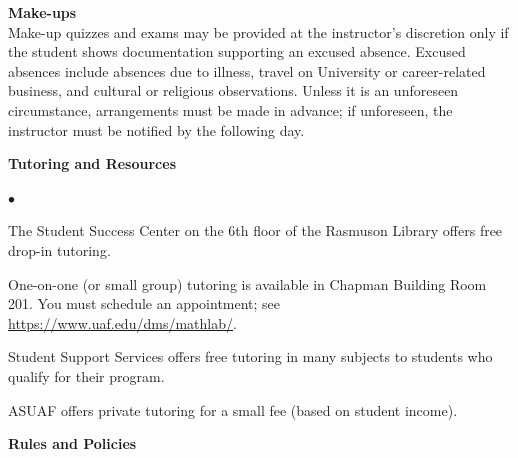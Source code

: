 \documentclass[12pt]{article}
\renewcommand{\emph}[1]{\textsf{\textbf{#1}}}
\newcommand{\localhead}[1]{\par\smallskip\textbf{#1}\nobreak\\}%
\def\heading#1{\localhead{\large\emph{#1}}}
\def\subheading#1{\localhead{\emph{#1}}}
\newenvironment{clist}%
{\bgroup\parskip 0pt\begin{list}{$\bullet$}{\partopsep 4pt\topsep 0pt\itemsep -2pt}}%
{\end{list}\egroup}%
\begin{document}
\heading{Make-ups}
Make-up quizzes and exams may be provided at the instructor's discretion only if
the student shows documentation supporting an excused absence. Excused
absences include absences due to illness, travel on University or
career-related business, and cultural or religious
observations. Unless it is an unforeseen circumstance, arrangements
must be made in advance; if unforeseen, the instructor must be notified
by the following day.

\heading{Tutoring and Resources}
\vskip -30pt\strut
\begin{clist}
	\item The Student Success Center on the 6th floor of the Rasmuson Library offers free drop-in tutoring.
	\item One-on-one (or small group) tutoring is available in 
Chapman Building Room 201. You must schedule an
appointment; see \url{https://www.uaf.edu/dms/mathlab/}.
	\item Student Support Services offers free tutoring in many subjects to students who qualify for their program.
	\item ASUAF offers private tutoring for a small fee (based on student income).
\end{clist}

\heading{Rules and Policies}
\vskip -20pt


\end{document}
